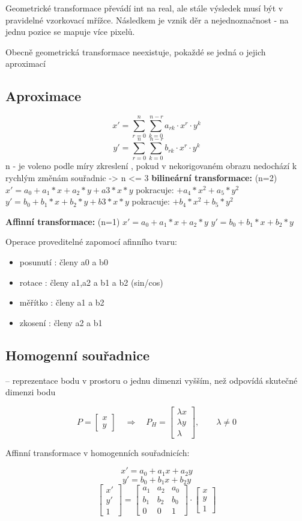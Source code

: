  Geometrické transformace převádí int na real, ale stále výsledek musí být v pravidelné vzorkovací mřížce.
 Následkem je vznik děr a nejednoznačnost - na jednu pozice se mapuje více pixelů.

Obecně geometrická transformace neexistuje, pokaždé se jedná o jejich aproximací

\subsection{Aproximace}

\[
x' = \sum_{r=0}^{n} \sum_{k=0}^{\,n-r} a_{rk} \cdot x^{r} \cdot y^{k}
\]
\[
y' = \sum_{r=0}^{n} \sum_{k=0}^{\,n-r} b_{rk} \cdot x^{r} \cdot y^{k}
\]
n - je voleno podle míry zkreslení , pokud v nekorigovaném obrazu nedochází k rychlým změnám souřadnic -> n <= 3
\textbf{bilineární transformace: }
(n=2)
$x' = a_0 +a_1*x + a_2*y + a3*x*y$ pokracuje: $+a_4*x^2+a_5*y^2$
$y' = b_0 +b_1*x + b_2*y + b3*x*y$ pokracuje: $+b_4*x^2+b_5*y^2$

\textbf{Affinní transformace: }
(n=1)
$x' = a_0 +a_1*x + a_2*y$ 
$y' = b_0 +b_1*x + b_2*y$

Operace proveditelné zapomocí afinního tvaru:
\begin{itemize}
    \item posunutí : členy a0 a b0
    \item rotace : členy a1,a2 a b1 a b2 (sin/cos)
    \item měřítko : členy a1 a b2
    \item zkosení : členy a2 a b1
\end{itemize}
\subsection{Homogenní souřadnice}
– reprezentace bodu v prostoru o jednu dimenzi vyšším, než odpovídá skutečné dimenzi bodu

\[
P = 
\begin{bmatrix}
x \\ y
\end{bmatrix}
\quad \Rightarrow \quad
P_H =
\begin{bmatrix}
\lambda x \\ \lambda y \\ \lambda
\end{bmatrix},
\qquad \lambda \neq 0
\]

Affinní transformace v homogenních souřadnicích:

\[
x' = a_0 + a_1 x + a_2 y
\]
\[
y' = b_0 + b_1 x + b_2 y
\]
\[
\begin{bmatrix}
x' \\
y' \\
1
\end{bmatrix}
=
\begin{bmatrix}
a_1 & a_2 & a_0 \\
b_1 & b_2 & b_0 \\
0   & 0   & 1
\end{bmatrix}
\cdot
\begin{bmatrix}
x \\
y \\
1
\end{bmatrix}
\]

